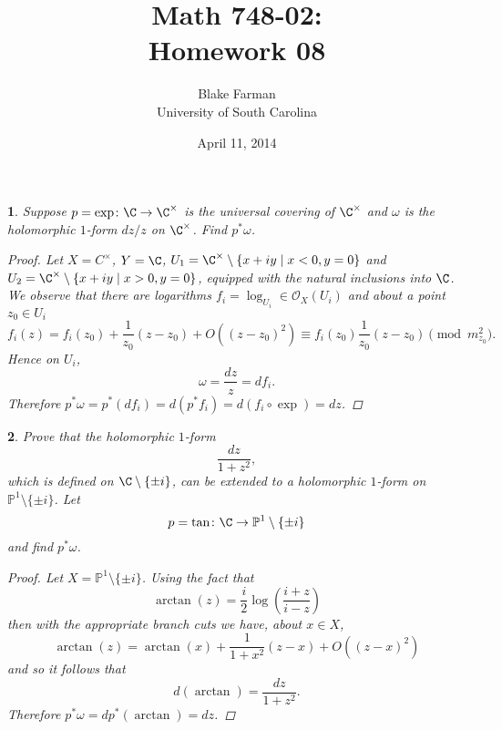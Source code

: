 \documentclass[10pt]{amsart}
\author{Blake Farman\\University of South Carolina}
\title{Math 748-02:\\Homework 08}
\date{April 11, 2014}
\begin{document}
\maketitle

\providecommand{\p}{\mathfrak{p}}
\providecommand{\m}{\mathfrak{m}}
\providecommand{\Deck}[1]{\operatorname{Deck}\left(#1\right)}

\newtheorem{thm}{}
\newtheorem{lem}{Lemma}
\newtheorem{prop}{Proposition}
\theoremstyle{definition}
\newtheorem{defn}{Definition}[thm]

\newcommand{\A}{\mathbb{A}}

\begin{thm}
  Suppose $p = \exp \colon \C \rightarrow \C^\times$ is the universal covering of $\C^\times$ and $\omega$ is the holomorphic $1$-form $dz/z$ on $\C^\times$.
  Find $p^*\omega$.
  
  \begin{proof}
    Let $X = C^\times$, $Y = \C$, $U_1 = \C^\times \setminus \left\{x + iy \;\middle\vert\; x < 0, y = 0\right\}$ and $U_2 = \C^\times \setminus \left\{x + iy \;\middle\vert\; x > 0, y = 0\right\}$, 
    equipped with the natural inclusions into $\C$.
    We observe that there are logarithms $f_i = \log_{U_i} \in \mathcal{O}_X(U_i)$ and about a point $z_0 \in U_i$
    $$f_i(z) = f_i(z_0) + \frac{1}{z_0}(z - z_0) + O((z - z_0)^2) \equiv f_i(z_0) \frac{1}{z_0}(z - z_0) \pmod{m_{z_0}^2}.$$
    Hence on $U_i$,
    $$\omega = \frac{dz}{z} = df_i.$$
    Therefore $p^*\omega = p^*(df_i) = d(p^*f_i) = d(f_i \circ \exp) = dz$.
  \end{proof}
\end{thm}

\begin{thm}
  Prove that the holomorphic $1$-form
  $$\frac{dz}{1 + z^2},$$
  which is defined on $\C\setminus\{\pm i\}$, can be extended to a holomorphic $1$-form on $\mathbb{P}^1\setminus \{\pm i\}$.
  Let
  $$p = \tan \colon \C \rightarrow \mathbb{P}^1\setminus\{\pm i\}$$
  and find $p^*\omega$.
  
  \begin{proof}
    Let $X = \mathbb{P}^1\setminus\{\pm i\}$.
    Using the fact that
    $$\arctan(z) = \frac{i}{2} \log\left(\frac{i + z}{i - z}\right)$$
    then with the appropriate branch cuts we have, about $x \in X$,
    $$\arctan(z) = \arctan(x) + \frac{1}{1 + x^2}(z - x) + O((z - x)^2)$$
    and so it follows that 
    $$d(\arctan) = \frac{dz}{1 + z^2}.$$
    Therefore $p^*\omega = dp^*(\arctan) = dz$.
  \end{proof}
\end{thm}
\end{document}
